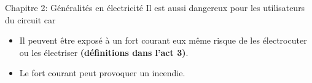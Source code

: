 \documentclass[24pt]{article}
\newcommand{\titre}{Chapitre 2: Généralités en électricité} %
\begin{document}
\begin{titlebox}{\titre}
    Il est aussi dangereux pour les utilisateurs du circuit car 
    
    \begin{itemize}
        \item Il peuvent être exposé à un fort courant eux même 
        risque de les électrocuter ou les électriser \textbf{\color{DarkRed} {(définitions dans l'act 3)}}.
        \item Le fort courant peut provoquer un incendie.
    \end{itemize}

\end{titlebox}
\end{document}
